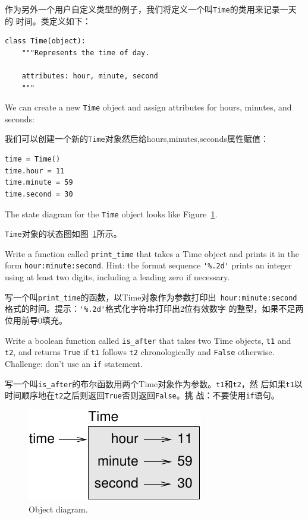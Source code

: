 \documentclass[10pt]{book}
\begin{document}
\begin{CJK}{UTF8}{gbsn}
作为另外一个用户自定义类型的例子，我们将定义一个叫{\tt Time}的类用来记录一天的
时间。类定义如下：

\begin{verbatim}
class Time(object):
    """Represents the time of day.
       
    attributes: hour, minute, second
    """
\end{verbatim}
%
We can create a new {\tt Time} object and assign
attributes for hours, minutes, and seconds:

我们可以创建一个新的{\tt Time}对象然后给hours,minutes,seconds属性赋值：

\begin{verbatim}
time = Time()
time.hour = 11
time.minute = 59
time.second = 30
\end{verbatim}
%
The state diagram for the {\tt Time} object looks like Figure~\ref{fig.time}.

{\tt Time}对象的状态图如图~\ref{fig.time}所示。

\begin{exercise}
\label{ex.printtime}

Write a function called \verb"print_time" that takes a 
Time object and prints it in the form {\tt hour:minute:second}.
Hint: the format sequence \verb"'%.2d'" prints an integer using
at least two digits, including a leading zero if necessary.

写一个叫\verb"print_time"的函数，以Time对象作为参数打印出{\tt
hour:minute:second}格式的时间。提示：\verb"'%.2d'"格式化字符串打印出2位有效数字
的整型，如果不足两位用前导0填充。

\end{exercise}

\begin{exercise}
\label{isafter}

Write a boolean function called \verb"is_after" that
takes two Time objects, {\tt t1} and {\tt t2}, and
returns {\tt True} if {\tt t1} follows {\tt t2} chronologically and
{\tt False} otherwise.  Challenge: don't use an {\tt if} statement.

写一个叫\verb"is_after"的布尔函数用两个Time对象作为参数。{\tt t1}和{\tt t2}，然
后如果{\tt t1}以时间顺序地在{\tt t2}之后则返回{\tt True}否则返回{\tt False}。挑
战：不要使用{\tt if}语句。
\end{exercise}

\begin{figure}
\centerline
{\includegraphics[scale=0.8]{figs/time.pdf}}
\caption{Object diagram.}
\label{fig.time}
\end{figure}



\end{CJK}
\end{document}
